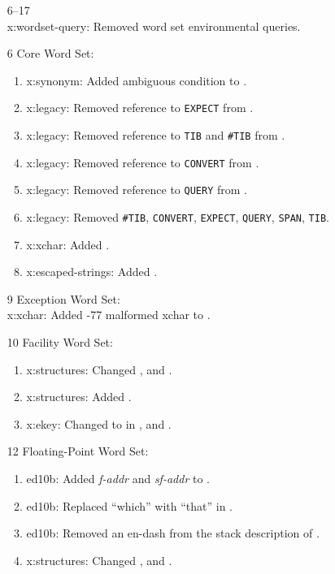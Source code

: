 \begin{itemize}
	\item[6--17] ~\\
		\textsf{x:wordset-query}: Removed word set environmental queries.

	\item[6] Core Word Set:
		\begin{enumerate}
		\item \textsf{x:synonym}: Added ambiguous condition to .
		\item \textsf{x:legacy}: Removed reference to \texttt{EXPECT} from
			.
		\item \textsf{x:legacy}: Removed reference to \texttt{TIB} and
			\texttt{\#TIB} from .
		\item \textsf{x:legacy}: Removed reference to \texttt{CONVERT} from
			.
		\item \textsf{x:legacy}: Removed reference to \texttt{QUERY} from
			.
		\item \textsf{x:legacy}: Removed \texttt{\#TIB},
			\texttt{CONVERT},
			\texttt{EXPECT},
			\texttt{QUERY},
			\texttt{SPAN},
			\texttt{TIB}.
		\item \textsf{x:xchar}: Added .
		\item \textsf{x:escaped-strings}: Added .
		\end{enumerate}

	\item[9] Exception Word Set: \\
		\textsf{x:xchar}: Added -77 malformed xchar to .

	\item[10] Facility Word Set:
		\begin{enumerate}
		\item \textsf{x:structures}: Changed ,
			and .
		\item \textsf{x:structures}: Added .
		\item \textsf{x:ekey}: Changed  to  in
			,
			 and \linebreak
			.
		\end{enumerate}

	\item[12] Floating-Point Word Set:
		\begin{enumerate}
		\item \textsf{ed10b}: Added \emph{f-addr} and \emph{sf-addr} to
			.
		\item \textsf{ed10b}: Replaced ``which'' with ``that'' in
			.
		\item \textsf{ed10b}: Removed an en-dash from the stack description of
			.
		\item \textsf{x:structures}: Changed ,
			 and
			.
		\end{enumerate}


\end{itemize}

